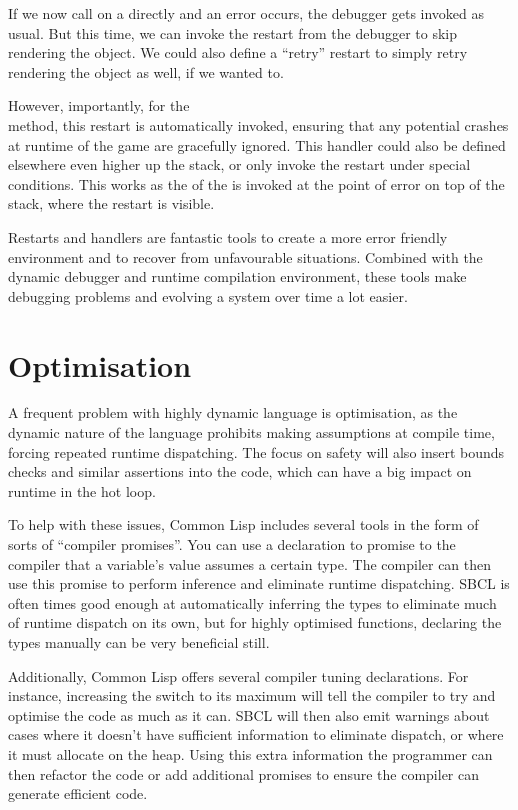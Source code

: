 \documentclass[a4paper]{paper}
\begin{document}
If we now call  on a  directly and an error occurs, the debugger gets invoked as usual. But this time, we can invoke the  restart from the debugger to skip rendering the object. We could also define a ``retry'' restart to simply retry rendering the object as well, if we wanted to.

However, importantly, for the  \\ method, this restart is automatically invoked, ensuring that any potential crashes at runtime of the game are gracefully ignored. This handler could also be defined elsewhere even higher up the stack, or only invoke the restart under special conditions. This works as the  of the  is invoked at the point of error on top of the stack, where the  restart is visible.

Restarts and handlers are fantastic tools to create a more error friendly environment and to recover from unfavourable situations. Combined with the dynamic debugger and runtime compilation environment, these tools make debugging problems and evolving a system over time a lot easier.

\section{Optimisation}
A frequent problem with highly dynamic language is optimisation, as the dynamic nature of the language prohibits making assumptions at compile time, forcing repeated runtime dispatching. The focus on safety will also insert bounds checks and similar assertions into the code, which can have a big impact on runtime in the hot loop.

To help with these issues, Common Lisp includes several tools in the form of sorts of ``compiler promises''. You can use a declaration to promise to the compiler that a variable's value assumes a certain type. The compiler can then use this promise to perform inference and eliminate runtime dispatching. SBCL is often times good enough at automatically inferring the types to eliminate much of runtime dispatch on its own, but for highly optimised functions, declaring the types manually can be very beneficial still.

Additionally, Common Lisp offers several compiler tuning declarations. For instance, increasing the  switch to its maximum will tell the compiler to try and optimise the code as much as it can. SBCL will then also emit warnings about cases where it doesn't have sufficient information to eliminate dispatch, or where it must allocate on the heap. Using this extra information the programmer can then refactor the code or add additional promises to ensure the compiler can generate efficient code.
\end{document}
